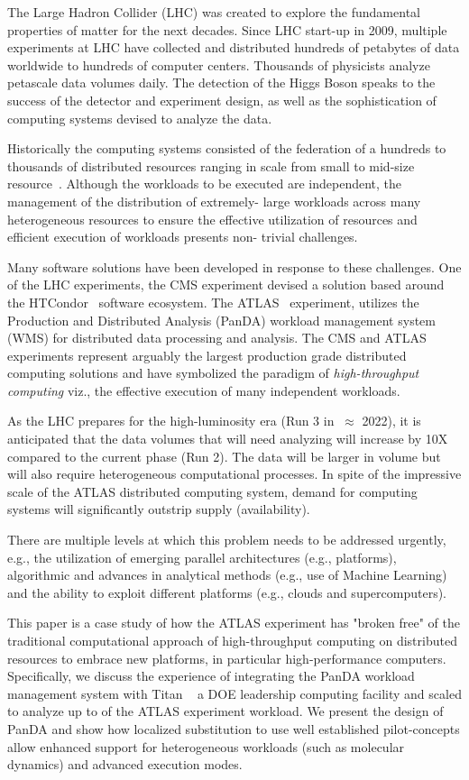 The Large Hadron Collider (LHC) was created to explore the fundamental
properties of matter for the next decades.  Since LHC start-up in 2009,
multiple experiments  at LHC have collected and distributed hundreds of
petabytes of data worldwide to hundreds of computer centers. Thousands of
physicists analyze petascale data volumes daily. The detection of the Higgs
Boson speaks to the success of the detector and experiment design, as well as
the sophistication of computing systems devised to analyze the data.

Historically the computing systems consisted of the federation of a hundreds
to thousands of distributed resources \textemdash{} ranging in scale from
small to mid-size resource~\cite{foster2003grid}. Although the workloads to be
executed are independent, the management of the distribution of extremely-
large workloads across many heterogeneous resources to ensure the effective
utilization of resources and efficient execution of workloads presents non-
trivial challenges.

Many software solutions have been developed in response to these challenges.
One of the LHC experiments, the CMS experiment devised a solution based around
the HTCondor~\cite{XX} software ecosystem. The ATLAS~\cite{Aad:2008}
experiment, utilizes the Production and Distributed Analysis (PanDA) workload
management system~\cite{Maeno2011} (WMS) for distributed data processing and
analysis. The CMS and ATLAS experiments represent arguably the largest
production grade distributed computing solutions and have symbolized the
paradigm of {\it high-throughput computing} viz., the effective execution of
many independent workloads.

As the LHC prepares for the high-luminosity era (Run 3 in $~\approx$ 2022), it
is anticipated that the data volumes that will need analyzing will increase by
10X compared to the current phase (Run 2).   The data will be larger in volume
but will also require heterogeneous computational processes. In spite of the
impressive scale of the ATLAS distributed computing system, demand for
computing systems will significantly outstrip supply (availability).

There are multiple levels at which this problem needs to be addressed
urgently, e.g., the utilization of emerging parallel architectures (e.g.,
platforms), algorithmic and advances in analytical methods (e.g., use of
Machine Learning) and the ability to exploit different platforms (e.g., clouds
and supercomputers).

This paper is a case study of how the ATLAS experiment has "broken free" of
the traditional computational approach of high-throughput computing on
distributed resources to embrace new platforms, in particular high-performance
computers. Specifically, we discuss the experience of integrating the PanDA
workload management system with Titan ~\textemdash{} a DOE leadership
computing facility and scaled to analyze up to  of the ATLAS
experiment workload. We present the design of PanDA and show how localized
substitution to use well established pilot-concepts allow enhanced support for
heterogeneous workloads (such as molecular dynamics) and advanced execution
modes.

